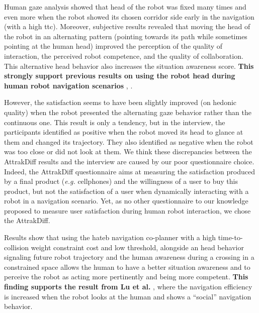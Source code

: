 \documentclass[a4paper,11pt,twoside]{StyleThese}
\begin{document}
Human gaze analysis showed that head of the robot was fixed many times and even more when the robot showed its chosen corridor side early in the navigation (with a high \acrshort{ttc}). Moreover, subjective results revealed that moving the head of the robot in an alternating pattern (pointing towards its path while sometimes pointing at the human head) improved the perception of the quality of interaction, the perceived robot competence, and the quality of collaboration. This alternative head behavior also increases the situation awareness score. \textbf{This strongly support previous results on using the robot head during human robot navigation scenarios} \cite{khambhaita_head-body_2016}, \cite{may_show_2015}.

However, the satisfaction seems to have been slightly improved (on hedonic quality) when the robot presented the alternating gaze behavior rather than the continuous one. This result is only a tendency, but in the interview, the participants identified as positive when the robot moved its head to glance at them and changed its trajectory. They also identified as negative when the robot was too close or did not look at them. We think these discrepancies between the AttrakDiff results and the interview are caused by our poor questionnaire choice. Indeed, the AttrakDiff questionnaire aims at measuring the satisfaction produced by a final product (\textit{e.g.} cellphones) and the willingness of a user to buy this product, but not the satisfaction of a user when dynamically interacting with a robot in a navigation scenario. Yet, as no other questionnaire to our knowledge proposed to measure user satisfaction during human robot interaction, we chose the AttrakDiff.

Results show that using the \acrshort{hateb} navigation co-planner with a high time-to-collision weight constraint cost and low threshold, alongside an head behavior signaling future robot trajectory and the human awareness during a crossing in a constrained space allows the human to have a better situation awareness and to perceive the robot as acting more pertinently and being more competent. \textbf{This finding supports the result from Lu et al.} \cite{lu_towards_2013}, where the navigation efficiency is increased when the robot looks at the human and shows a ``social'' navigation behavior.
\end{document}

